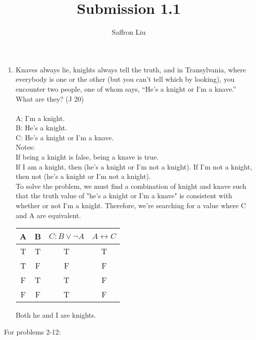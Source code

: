 \documentclass{article}
\title{Submission 1.1}
\author{Saffron Liu}
\date{}
\begin{document}
\maketitle

\begin{enumerate}
      \item Knaves always lie, knights always tell the truth, and in Transylvania, where everybody is one or the other (but you can’t tell which by looking), you encounter two people, one of whom says, “He’s a knight or I’m a knave.” What are they? (J 20)\\\\
            A: I'm a knight.\\
            B: He's a knight.\\
            C: He's a knight or I'm a knave.\\
            Notes:\\
            If being a knight is false, being a knave is true.\\
            If I am a knight, then (he's a knight or I'm not a knight). If I'm not a knight, then not (he's a knight or I'm not a knight).\\
            To solve the problem, we must find a combination of knight and knave such that the truth value of "he's a knight or I'm a knave" is consistent with whether or not I'm a knight. Therefore, we're searching for a value where C and A are equivalent.\\
            \begin{tabular}{c|c|c|c}
                  A & B & $C: B \lor \neg A$ & $A \leftrightarrow C$ \\
                  \hline
                  T & T & T                  & T                     \\
                  T & F & F                  & F                     \\
                  F & T & T                  & F                     \\
                  F & F & T                  & F                     \\
            \end{tabular}
            Both he and I are knights.
\end{enumerate}
\begin{flushleft}
      For problems 2-12:\\
\end{flushleft}
\end{document}
